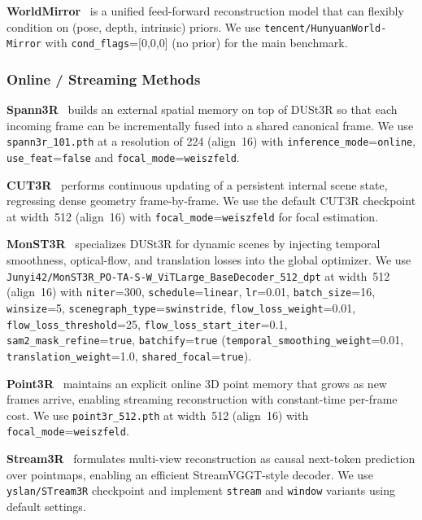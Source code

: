 \textbf{WorldMirror}~\citep{liu2025worldmirror} is a unified feed-forward reconstruction model that can flexibly condition on (pose, depth, intrinsic) priors.
%
We use \texttt{tencent/HunyuanWorld-Mirror} with \texttt{cond\_flags}=[0,0,0] (no prior) for the main benchmark.

\subsubsection{Online / Streaming Methods}

\textbf{Spann3R}~\citep{wang2024spann3r} builds an external spatial memory on top of DUSt3R so that each incoming frame can be incrementally fused into a shared canonical frame.
%
We use \texttt{spann3r\_101.pth} at a resolution of 224 (align~16) with \texttt{inference\_mode}=\texttt{online}, \texttt{use\_feat}=\texttt{false} and
\texttt{focal\_mode}=\texttt{weiszfeld}.

\textbf{CUT3R}~\citep{wang2025cut3r} performs continuous updating of a persistent internal scene state, regressing dense geometry frame-by-frame. We use the default CUT3R checkpoint at width~512 (align~16) with \texttt{focal\_mode}=\texttt{weiszfeld} for focal estimation.

\textbf{MonST3R}~\citep{zhang2024monst3r} specializes DUSt3R for dynamic scenes by injecting temporal smoothness, optical-flow, and translation losses into the global optimizer.
%
We use \texttt{Junyi42/MonST3R\_PO-TA-S-W\_ViTLarge\_BaseDecoder\_512\_dpt} at width~512 (align~16) with \texttt{niter}=300, \texttt{schedule}=\texttt{linear}, \texttt{lr}=0.01, \texttt{batch\_size}=16, \texttt{winsize}=5, \texttt{scenegraph\_type}=\texttt{swinstride}, \texttt{flow\_loss\_weight}=0.01, \texttt{flow\_loss\_threshold}=25, \texttt{flow\_loss\_start\_iter}=0.1, \texttt{sam2\_mask\_refine}=\texttt{true}, \texttt{batchify}=\texttt{true} (\texttt{temporal\_smoothing\_weight}=0.01, \texttt{translation\_weight}=1.0, \texttt{shared\_focal}=\texttt{true}).


\textbf{Point3R}~\citep{point3r} maintains an explicit online 3D point memory that grows as new frames arrive, enabling streaming reconstruction with constant-time per-frame cost. We use \texttt{point3r\_512.pth} at width~512 (align~16) with \texttt{focal\_mode}=\texttt{weiszfeld}.

\textbf{Stream3R}~\citep{stream3r2025} formulates multi-view reconstruction as causal next-token prediction over pointmaps, enabling an efficient StreamVGGT-style decoder. 
%
We use \texttt{yslan/STream3R} checkpoint and implement \texttt{stream} and \texttt{window} variants using default settings.

